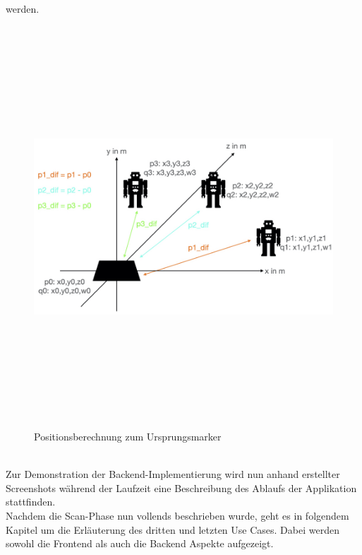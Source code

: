 werden.
\begin{figure}[hbt!]
    \centering
    \includegraphics[width=15cm,height=15cm,keepaspectratio]{4Umsetzung/Bilder/difcalc.jpeg}
    \caption{Positionsberechnung zum Ursprungsmarker}
    \label{pic:differenztoinitial}
\end{figure}
\pagebreak
\\ 
\linebreak
Zur Demonstration der Backend-Implementierung wird nun anhand erstellter Screenshots während der Laufzeit eine Beschreibung des Ablaufs der Applikation stattfinden.
\\ 
\linebreak  
Nachdem die Scan-Phase nun vollends beschrieben wurde, geht es in folgendem Kapitel um die Erläuterung des dritten und letzten Use Cases. Dabei werden sowohl 
die Frontend als auch die Backend Aspekte aufgezeigt. 